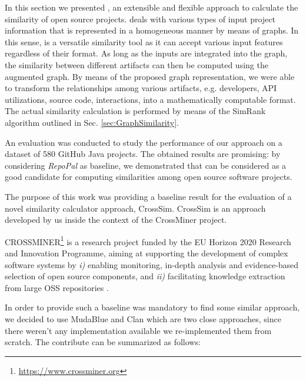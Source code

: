 
In this section we presented \CrossSim, an extensible and flexible approach to calculate the similarity of open source projects. \CrossSim deals with various types of input project information that is represented in a homogeneous manner by means of graphs. In this sense, \CrossSim is a versatile similarity tool as it can accept various input features regardless of their format. As long as the inputs are integrated into the graph, the similarity between different artifacts can then be computed using the augmented graph.  By means of the proposed graph representation, we were able to transform the relationships among various artifacts, e.g. developers, API utilizations, source code, interactions, into a mathematically computable format. The actual similarity calculation is performed by means of the SimRank algorithm outlined in Sec. \ref{sec:GraphSimilarity}. 

An evaluation was conducted to study the performance of our approach on a dataset of 580 GitHub Java projects. The obtained results are promising: by considering \textit{RepoPal} as baseline, we demonstrated that \projectName can be considered as a good candidate for computing similarities among open source software projects. 



The purpose of this work was providing a baseline result for the evaluation of a novel similarity calculator approach, CrossSim.
CrossSim is an approach developed by us inside the context of the CrossMiner project.

CROSSMINER\footnote{\url{https://www.crossminer.org}} is a research project funded by the EU Horizon 2020 Research and Innovation Programme, aiming at supporting the development of complex software systems by \textit{i)} enabling monitoring, in-depth analysis and evidence-based selection of open source components, and \textit{ii)} facilitating knowledge extraction from large OSS repositories \cite{10.1007/978-3-319-74730-9_33}. 

In order to provide such a baseline was mandatory to find some similar approach, we decided to use MudaBlue and Clan which are two close approaches, since there weren't any implementation available we re-implemented them from scratch. The contribute can be summarized as follows:

